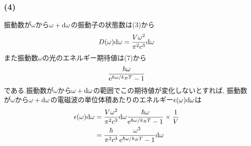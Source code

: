 \documentclass[uplatex,a4j,11pt,dvipdfmx]{jsarticle}
\begin{document}
\subsubsection*{(4)}
振動数が$\omega$から$\omega+{\rm d}\omega$の振動子の状態数は(3)から
\begin{align}
  D(\omega){\rm d}\omega=\frac{V\omega^2}{\pi^2c^3}{\rm d}\omega
\end{align}
また振動数$\omega$の光のエネルギー期待値は(7)から
\begin{align}
  \frac{\hbar\omega}{{\rm e}^{\hbar\omega/k_BT}-1}
\end{align}
である.振動数が$\omega$から$\omega+{\rm d}\omega$の範囲でこの期待値が変化しないとすれば,
振動数が$\omega$から$\omega+{\rm d}\omega$の電磁波の単位体積あたりのエネルギー$\epsilon(\omega){\rm d}\omega$は
\begin{align}
  \begin{split}
    \epsilon(\omega){\rm d}\omega&=\frac{V\omega^2}{\pi^2c^3}{\rm d}\omega\frac{\hbar\omega}{{\rm e}^{\hbar\omega/k_BT}-1}\times\frac{1}{V}\\
    &=\frac{\hbar}{\pi^2c^3}\frac{\omega^3}{{\rm e}^{\hbar\omega/k_BT}-1}{\rm d}\omega
  \end{split}
\end{align}
\end{document}
